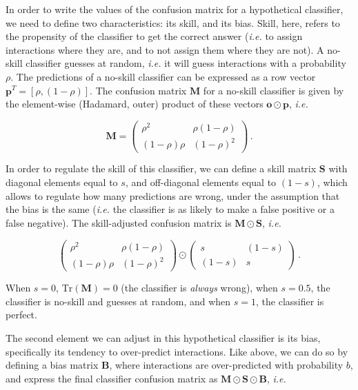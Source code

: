 \documentclass[11pt]{article}
\begin{document}
In order to write the values of the confusion matrix for a hypothetical
classifier, we need to define two characteristics: its skill, and its
bias. Skill, here, refers to the propensity of the classifier to get the
correct answer (\emph{i.e.} to assign interactions where they are, and
to not assign them where they are not). A no-skill classifier guesses at
random, \emph{i.e.} it will guess interactions with a probability
\(\rho\). The predictions of a no-skill classifier can be expressed as a
row vector \(\mathbf{p}^T = [\rho, (1-\rho)]\). The confusion matrix
\(\mathbf{M}\) for a no-skill classifier is given by the element-wise
(Hadamard, outer) product of these vectors
\(\mathbf{o} \odot \mathbf{p}\), \emph{i.e.}

\[
\mathbf{M} = \begin{pmatrix}
    \rho^2 & \rho (1-\rho) \\
    (1-\rho) \rho & (1-\rho)^2
\end{pmatrix} \,.
\]

In order to regulate the skill of this classifier, we can define a skill
matrix \(\mathbf{S}\) with diagonal elements equal to \(s\), and
off-diagonal elements equal to \((1-s)\), which allows to regulate how
many predictions are wrong, under the assumption that the bias is the
same (\emph{i.e.} the classifier is as likely to make a false positive
or a false negative). The skill-adjusted confusion matrix is
\(\mathbf{M} \odot \mathbf{S}\), \emph{i.e.}

\[
\begin{pmatrix}
    \rho^2 & \rho (1-\rho) \\
    (1-\rho) \rho & (1-\rho)^2
\end{pmatrix} \odot \begin{pmatrix}
    s & (1-s) \\
    (1-s) & s
\end{pmatrix} \,.
\]

When \(s=0\), \(\text{Tr}(\mathbf{M}) = 0\) (the classifier is
\emph{always} wrong), when \(s=0.5\), the classifier is no-skill and
guesses at random, and when \(s=1\), the classifier is perfect.

The second element we can adjust in this hypothetical classifier is its
bias, specifically its tendency to over-predict interactions. Like
above, we can do so by defining a bias matrix \(\mathbf{B}\), where
interactions are over-predicted with probability \(b\), and express the
final classifier confusion matrix as
\(\mathbf{M}\odot \mathbf{S}\odot \mathbf{B}\), \emph{i.e.}
\end{document}
